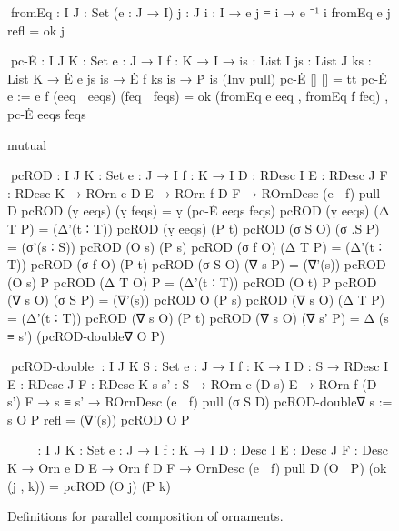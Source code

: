 \begin{figure}
\codefigure\small{}\baselineskip
\begin{code}
^^^fromEq : {I J : Set} (e : J → I) {j : J} {i : I} → e j ≡ i → e ⁻¹ i
fromEq e {j} refl = ok j

^^^pc-Ė :  {I J K : Set} {e : J → I} {f : K → I} →
           {is : List I} {js : List J} {ks : List K} →
           Ė e js is → Ė f ks is → Ṗ is (Inv pull)
pc-Ė               []            []            =  tt
pc-Ė {e := e} {f}  (eeq ∷ eeqs)  (feq ∷ feqs)  =  ok (fromEq e eeq , fromEq f feq) ,
                                                  pc-Ė eeqs feqs

mutual

  ^^^pcROD :  {I J K : Set} {e : J → I} {f : K → I}
              {D : RDesc I} {E : RDesc J} {F : RDesc K} →
              ROrn e D E → ROrn f D F → ROrnDesc (e ⋈ f) pull D
  pcROD (ṿ eeqs)    (ṿ feqs)  = ṿ (pc-Ė eeqs feqs)
  pcROD (ṿ eeqs)    (Δ T P)   = (Δ'(t ∶ T))  pcROD (ṿ eeqs)  (P t)
  pcROD (σ S O)     (σ .S P)  = (σ'(s ∶ S))  pcROD (O s)    (P s)
  pcROD (σ f O)     (Δ T P)   = (Δ'(t ∶ T))  pcROD (σ f O)  (P t)
  pcROD (σ S O)     (∇ s P)   = (∇'(s))      pcROD (O s)    P
  pcROD (Δ T O)     P         = (Δ'(t ∶ T))  pcROD (O t)    P
  pcROD (∇ s O)     (σ S P)   = (∇'(s))      pcROD O        (P s)
  pcROD (∇ s O)     (Δ T P)   = (Δ'(t ∶ T))  pcROD (∇ s O)  (P t)
  pcROD (∇ s O)     (∇ s' P)  = Δ (s ≡ s') (pcROD-double∇ O P)

  ^^^pcROD-double∇ :
    {I J K S : Set} {e : J → I} {f : K → I}
    {D : S → RDesc I} {E : RDesc J} {F : RDesc K} {s s' : S} →
    ROrn e (D s) E → ROrn f (D s') F →
    s ≡ s' → ROrnDesc (e ⋈ f) pull (σ S D)
  pcROD-double∇ {s := s} O P refl = (∇'(s)) pcROD O P

^^^_⊗_ :  {I J K : Set} {e : J → I} {f : K → I}
          {D : Desc I} {E : Desc J} {F : Desc K} →
          Orn e D E → Orn f D F → OrnDesc (e ⋈ f) pull D
(O ⊗ P) (ok (j , k)) = pcROD (O j) (P k)
\end{code}
\caption{Definitions for parallel composition of ornaments.}
\label{fig:parallel-composition}
\end{figure}

